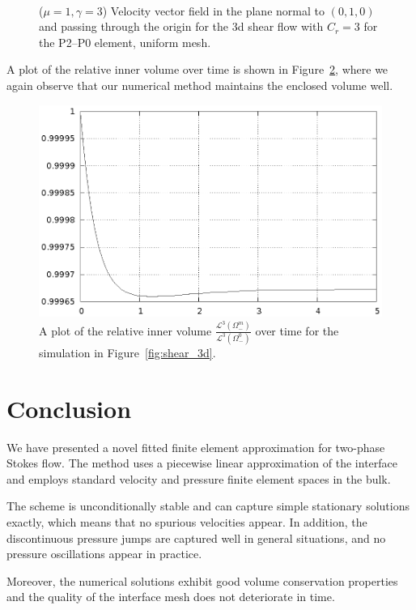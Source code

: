 \documentclass[a4paper,12pt,onecolumn]{article}
\begin{document}
\begin{figure}[htbp]
  \centering
  \\
  \caption{($\mu=1,\gamma=3$) Velocity vector field in the plane normal to $(0,1,0)$ and passing through the origin for the 3d shear flow with $C_r=3$ for the P2--P0 element, uniform mesh.}
  \label{fig:shear_3d_velocity}
\end{figure}
A plot of the relative inner volume over time is shown in 
Figure~\ref{fig:shear_3d_bulk_inner_volume}, where we again observe that our
numerical method maintains the enclosed volume well.

\begin{figure}[htbp]
  \centering
  \includegraphics[width=.45\textwidth]{figures/3d_shear_bulk_inner_volume.ps}
  \caption{A plot of the relative inner volume 
$\frac{\mathcal{L}^3(\Omega^m_-)}{\mathcal{L}^3(\Omega^0_-)}$
over time for the simulation in Figure~\ref{fig:shear_3d}.}
  \label{fig:shear_3d_bulk_inner_volume}
\end{figure}

\section{Conclusion}\label{sec:conclusion}
We have presented a novel fitted finite element approximation for two-phase
Stokes flow. The method uses a piecewise linear approximation of the interface
and employs standard velocity and pressure finite element spaces in the bulk.

The scheme is unconditionally stable and can capture simple stationary
solutions exactly, which means that no spurious velocities appear. In addition,
the discontinuous pressure jumps are captured well in general situations, and
no pressure oscillations appear in practice.

Moreover, the numerical solutions exhibit good volume conservation properties
and the quality of the interface mesh does not deteriorate in time.

 

\end{document}
